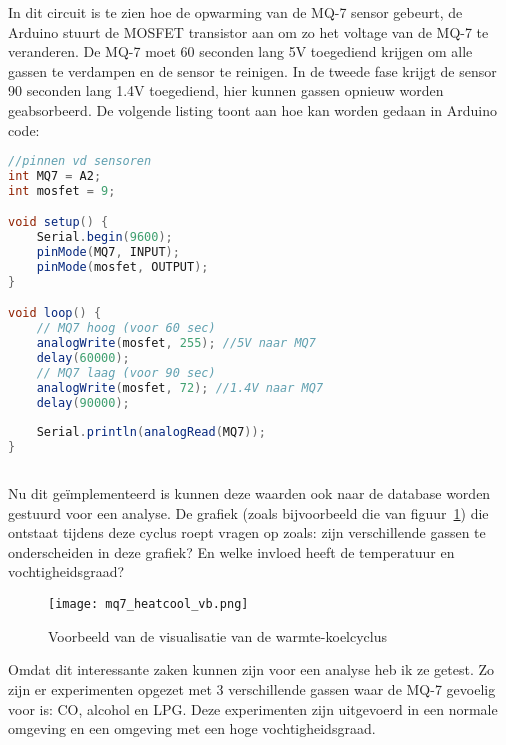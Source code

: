 In dit circuit is te zien hoe de opwarming van de MQ-7 sensor gebeurt, de Arduino stuurt de MOSFET transistor aan om zo het voltage van de MQ-7 te veranderen. De MQ-7 moet 60 seconden lang 5V toegediend krijgen om alle gassen te verdampen en de sensor te reinigen. In de tweede fase krijgt de sensor 90 seconden lang 1.4V toegediend, hier kunnen gassen opnieuw worden geabsorbeerd. De volgende listing toont aan hoe kan worden gedaan in Arduino code:

\begin{lstlisting}[language=Java,caption={Warmte-koelcyclus MQ-7}]
//pinnen vd sensoren 
int MQ7 = A2;
int mosfet = 9;

void setup() {
    Serial.begin(9600);
    pinMode(MQ7, INPUT);
    pinMode(mosfet, OUTPUT);
}

void loop() {
    // MQ7 hoog (voor 60 sec)
    analogWrite(mosfet, 255); //5V naar MQ7
    delay(60000);
    // MQ7 laag (voor 90 sec)
    analogWrite(mosfet, 72); //1.4V naar MQ7
    delay(90000);
    
    Serial.println(analogRead(MQ7));
}
        
\end{lstlisting}

Nu dit geïmplementeerd is kunnen deze waarden ook naar de database worden gestuurd voor een analyse. De grafiek (zoals bijvoorbeeld die van figuur~\ref{fig:mq7_heatcool_vb}) die ontstaat tijdens deze cyclus roept vragen op zoals: zijn verschillende gassen te onderscheiden in deze grafiek? En welke invloed heeft de temperatuur en vochtigheidsgraad?

\begin{figure}[h]
    \texttt{[image: mq7\_heatcool\_vb.png]}
    \caption[Warmte-koelcyclus in de praktijk]{Voorbeeld van de visualisatie van de warmte-koelcyclus}
    \label{fig:mq7_heatcool_vb}
\end{figure}


Omdat dit interessante zaken kunnen zijn voor een analyse heb ik ze getest. Zo zijn er experimenten opgezet met 3 verschillende gassen waar de MQ-7 gevoelig voor is: CO, alcohol en LPG. Deze experimenten zijn uitgevoerd in een normale omgeving en een omgeving met een hoge vochtigheidsgraad.


